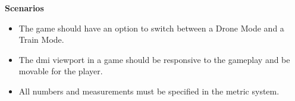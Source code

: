 \textbf{Scenarios} 
\begin{itemize}
    \item The game should have an option to switch between a Drone Mode and a Train Mode. 
    \item The \acrshort{dmi}  viewport in a game should be responsive to the gameplay and be movable for the player.
    \item All numbers and measurements must be specified in the metric system.
\end{itemize}